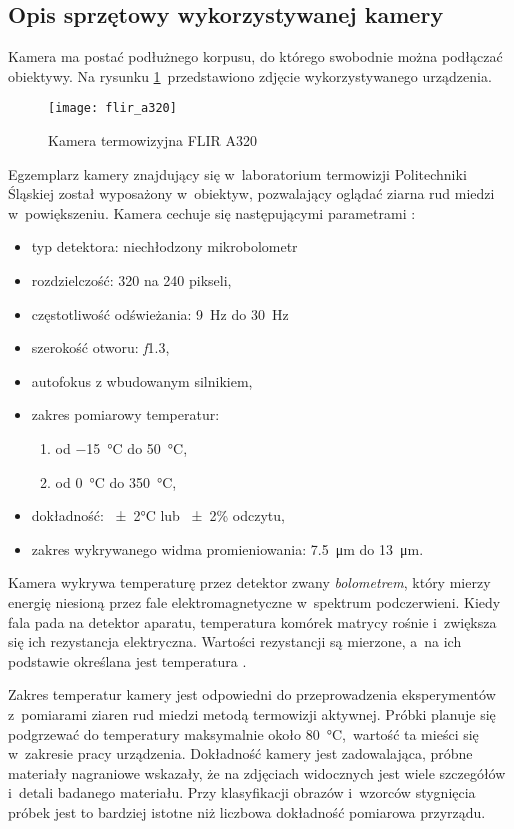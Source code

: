 \subsection{Opis sprzętowy wykorzystywanej kamery}
Kamera ma postać podłużnego korpusu, do którego swobodnie można podłączać
obiektywy.
Na rysunku \ref{fig:camera}~przedstawiono zdjęcie wykorzystywanego urządzenia.
\begin{figure}[htb]
	\centering
	\texttt{[image: flir\_a320]}
	\caption{Kamera termowizyjna FLIR A320 \cite{flir_camera_specs}}
	\label{fig:camera}
\end{figure}
Egzemplarz kamery znajdujący się w~laboratorium termowizji Politechniki
Śląskiej został wyposażony w~obiektyw, pozwalający oglądać ziarna rud miedzi
w~powiększeniu.
Kamera cechuje się następującymi parametrami \cite{flir_camera_specs}:
\begin{itemize}
	\item typ detektora: niechłodzony mikrobolometr
	\item rozdzielczość: 320 na 240 pikseli,
	\item częstotliwość odświeżania: \SI{9}{\hertz} do \SI{30}{\hertz}
	\item szerokość otworu: \textit{f}\num{1,3},
	\item autofokus z wbudowanym silnikiem,
	\item zakres pomiarowy temperatur:
	      \begin{enumerate}
		      \item od \SI{-15}{\celsius} do \SI{+50}{\celsius},
		      \item od \SI{0}{\celsius} do \SI{350}{\celsius},
	      \end{enumerate}
	\item dokładność: \num{\pm2}\si{\celsius} lub \num{\pm2}\% odczytu,
	\item zakres wykrywanego widma promieniowania: \SI{7,5}{\micro\meter}
	      do \SI{13}{\micro\meter}.
\end{itemize}

Kamera wykrywa temperaturę przez detektor zwany \emph{bolometrem},
który mierzy energię niesioną przez fale elektromagnetyczne w~spektrum
podczerwieni.
Kiedy fala pada na detektor aparatu, temperatura komórek matrycy rośnie
i~zwiększa się ich rezystancja elektryczna.
Wartości rezystancji są mierzone, a~na ich podstawie określana jest
temperatura \cite{vanhoof_infrared}.

Zakres temperatur kamery jest odpowiedni do przeprowadzenia eksperymentów
z~pomiarami ziaren rud miedzi metodą termowizji aktywnej.
Próbki planuje się podgrzewać do temperatury maksymalnie około
\SI{80}{\celsius},~wartość ta mieści się w~zakresie pracy urządzenia.
Dokładność kamery jest zadowalająca, próbne materiały nagraniowe
wskazały, że na zdjęciach widocznych jest wiele szczegółów i~detali
badanego materiału.
Przy klasyfikacji obrazów i~wzorców stygnięcia próbek jest to
bardziej istotne niż liczbowa dokładność pomiarowa przyrządu.

